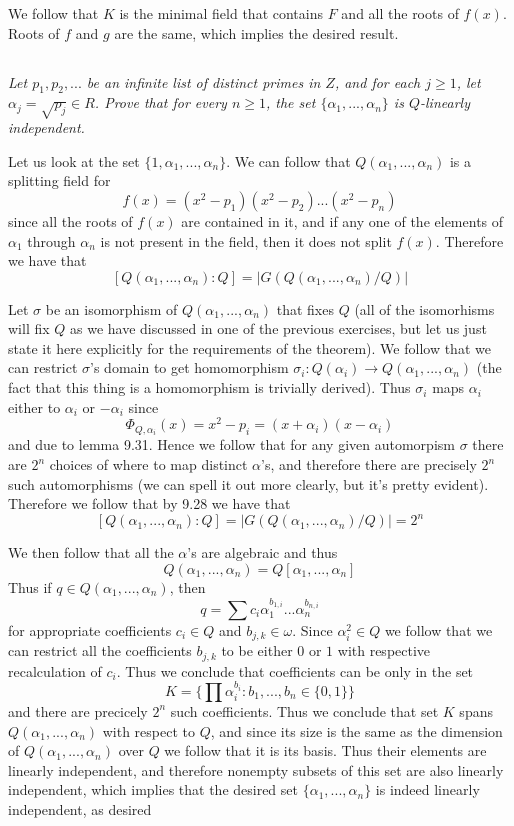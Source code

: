 \documentclass[11pt,oneside,titlepage]{book}
\newcommand{\set}[1]{\{ #1 \}}
\begin{document}
We follow that $K$ is the minimal field that contains $F$ and all the
roots of $f(x)$. Roots of $f$ and $g$ are the same, which implies
the desired result.

\subsection{}

\textit{Let $p_1, p_2, ...$ be an infinite list of distinct primes in $Z$,
  and for each $j \geq 1$, let $\alpha_j = \sqrt{p_j} \in R$. Prove that
  for every $n \geq 1$, the set $\set{\alpha_1, ..., \alpha_n}$ is $Q$-linearly
  independent.}

Let us look at the set $\set{1, \alpha_1, ..., \alpha_n}$. We can
follow that $Q(\alpha_1, ..., \alpha_n)$ is a splitting field for
$$f(x) = (x^2 - p_1)(x^2 - p_2) ... (x^2 - p_n)$$
since all the roots of $f(x)$ are contained in it, and if any one of
the elements of $\alpha_1$ through $\alpha_n$ is not present in the
field, then it does not split $f(x)$. Therefore we have that
$$[Q(\alpha_1, ..., \alpha_n):Q] = |G(Q(\alpha_1, ..., \alpha_n)/Q)|$$

Let $\sigma$ be an isomorphism of $Q(\alpha_1, ..., \alpha_n)$ that
fixes $Q$ (all of the isomorhisms will fix $Q$ as we have discussed in
one of the previous exercises, but let us just state it here
explicitly for the requirements of the theorem). We follow that we can
restrict $\sigma$'s domain to get homomorphism $\sigma_i: Q(\alpha_i)
\to Q(\alpha_1, ..., \alpha_n)$ (the fact that this thing is a
homomorphism is trivially derived). Thus $\sigma_i$ maps $\alpha_i$
either to $\alpha_i$ or $-\alpha_i$ since
$$\Phi_{Q, \alpha_i}(x) = x^2 - p_i = (x + \alpha_i)(x - \alpha_i)$$
and due to lemma 9.31. Hence we follow that for any given automorpism
$\sigma$ there are $2^n$ choices of where to map distinct $\alpha$'s,
and therefore there are precisely $2^n$ such automorphisms (we can spell
it out more clearly, but it's pretty evident). Therefore we follow that by
9.28 we have that
$$[Q(\alpha_1, ..., \alpha_n):Q] = |G(Q(\alpha_1, ..., \alpha_n)/Q)| = 2^n$$

We then follow that all the $\alpha$'s are algebraic and thus
$$Q(\alpha_1, ..., \alpha_n) = Q[\alpha_1, ..., \alpha_n]$$
Thus if $q \in Q(\alpha_1, ..., \alpha_n)$, then
$$q = \sum{c_i \alpha_1^{b_{1, i}} ... \alpha_n^{b_{n, i}}}$$
for appropriate coefficients $c_i \in Q$ and $b_{j, k} \in
\omega$. Since $\alpha_i^2 \in Q$ we follow that we can restrict all
the coefficients $b_{j, k}$ to be either $0$ or $1$ with respective
recalculation of $c_i$. Thus we conclude that coefficients can be only
in the set
$$K = \set{\prod{\alpha_i^{b_i}}: b_1, ..., b_n \in \set{0, 1}}$$
and there are precicely $2^n$ such coefficients. Thus we conclude that
set $K$ spans $Q(\alpha_1, ..., \alpha_n)$ with respect to $Q$, and
since its size is the same as the dimension of $Q(\alpha_1, ...,
\alpha_n)$ over $Q$ we follow that it is its basis. Thus their
elements are linearly independent, and therefore nonempty subsets of
this set are also linearly independent, which implies that the desired
set $\set{\alpha_1, ..., \alpha_n}$ is indeed linearly independent, as
desired
\end{document}
